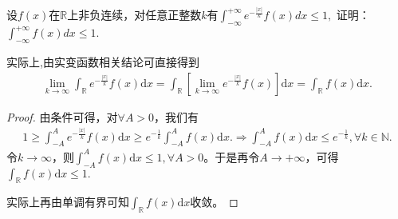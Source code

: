 \documentclass[../../main.tex]{subfiles}
\begin{document}
\begin{example}
设\(f(x)\)在\(\mathbb{R}\)上非负连续，对任意正整数\(k\)有$\int_{-\infty}^{+\infty} e^{-\frac{|x|}{k}}f(x)dx \leq 1,$
证明：$\int_{-\infty}^{+\infty}f(x)dx \leq 1.$
\end{example}
\begin{remark}
实际上,由实变函数相关结论可直接得到
\begin{align*}
\lim_{k\rightarrow \infty}\int_{\mathbb{R}}e^{-\frac{| x |}{k}}f( x ) \mathrm{d}x=\int_{\mathbb{R}}\left[ \lim_{k\rightarrow \infty}e^{-\frac{| x |}{k}}f( x ) \right] \mathrm{d}x=\int_{\mathbb{R}}f( x ) \mathrm{d}x.
\end{align*}
\end{remark}
\begin{proof}
由条件可得，对$\forall A>0$，我们有
\begin{align*}
1\geqslant \int_{-A}^Ae^{-\frac{| x |}{k}}f( x ) \mathrm{d}x\geqslant e^{-\frac{1}{k}}\int_{-A}^Af( x ) \mathrm{d}x.\Rightarrow \int_{-A}^Af( x ) \mathrm{d}x\leqslant e^{-\frac{1}{k}},\forall k\in \mathbb{N} .
\end{align*}
令$k\rightarrow \infty$，则$\int_{-A}^Af( x ) \mathrm{d}x\leqslant 1,\forall A>0$。于是再令$A\rightarrow +\infty$，可得$\int_{\mathbb{R}}f( x ) \mathrm{d}x\leqslant 1.$

实际上再由单调有界可知$\int_{\mathbb{R}}f( x ) \mathrm{d}x$收敛。
\end{proof}
\end{document}
